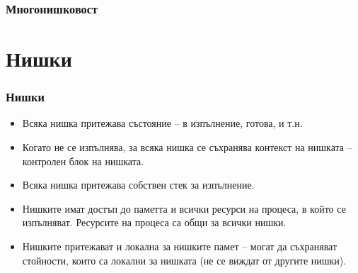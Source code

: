 \documentclass[ignorenonframetext, hyperref=unicode]{beamer}
\begin{document}
\begin{frame}\frametitle{Многонишковост}
\begin{figure}[h]
\center
{}
\end{figure}
\end{frame}

\section{Нишки}

\begin{frame}\frametitle{Нишки}
\begin{itemize}
\item Всяка нишка притежава състояние -- в изпълнение, готова, и т.н.
\item Когато не се изпълнява, за всяка нишка се съхранява контекст на нишката --
контролен блок на нишката.
\item Всяка нишка притежава собствен стек за изпълнение.
\item Нишките имат достъп до паметта и всички ресурси на процеса, в който се
изпълняват. Ресурсите на процеса са общи за всички нишки.
\item Нишките притежават и локална за нишките памет -- могат да съхраняват
стойности, които са локални за нишката (не се виждат от другите нишки).
\end{itemize}
\end{frame}
\end{document}
